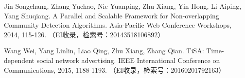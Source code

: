 \begin{resume}
\begin{enumerate}[{[}1{]}]
  \item Jin Songchang, Zhang Yuchao, Nie Yuanping, Zhu Xiang, Yin Hong, Li Aiping, Yang Shuqiang. A Parallel and Scalable Framework for Non-overlapping Community Detection Algorithms. Asia-Pacific Web Conference Workshops, 2014, 115-126. （EI收录，检索号：20143518106892）
  \item Wang Wei, Yang Linlin, Liao Qing, Zhu Xiang, Zhang Qian. TiSA: Time-dependent social network advertising. IEEE International Conference on Communications, 2015, 1188-1193. （EI收录，检索号：20160201792163）
  \end{enumerate}

\end{resume}
